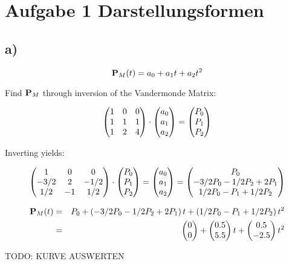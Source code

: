 
\section*{Aufgabe 1 Darstellungsformen}

\subsection*{a)}


\begin{equation}
    {\bf P}_M(t) = a_0 + a_1 t + a_2 t^2
\end{equation}

Find ${\bf P}_M$ through inversion of the Vandermonde Matrix:

\begin{equation}
    \left( \begin{matrix}1 & 0 & 0 \\ 1 & 1 & 1 \\ 1 & 2 & 4\end{matrix}\right) \cdot \left( \begin{matrix}a_0 \\ a_1 \\ a_2\end{matrix}\right) = \left( \begin{matrix}P_0 \\ P_1 \\ P_2\end{matrix}\right)
\end{equation}

Inverting yields:

\begin{equation}
    \left( \begin{matrix}1 & 0 & 0 \\ -3/2 & 2  & -1/2  \\ 1/2 & -1 & 1/2\end{matrix}\right) \cdot \left( \begin{matrix}P_0 \\ P_1 \\ P_2\end{matrix}\right) = \left( \begin{matrix}a_0 \\ a_1 \\ a_2\end{matrix}\right) 
    = \left( \begin{matrix}P_0 \\ -3/2 P_0 - 1/2 P_2 + 2 P_1 \\ 1/2 P_0 - P_1 + 1/2 P_2\end{matrix}\right)
\end{equation}


\begin{eqnarray}
     {\bf P}_M(t) &=&  P_0  + \left( -3/2 P_0 - 1/2 P_2 + 2 P_1 \right) t + \left( 1/2 P_0 - P_1 + 1/2 P_2 \right) t^2 \\
&=& \left( \begin{matrix}0 \\0\end{matrix}\right) + \left( \begin{matrix}0.5 \\ 5.5 \end{matrix}\right) t   + \left( \begin{matrix}0.5 \\ - 2.5 \end{matrix}\right) t^2 
\end{eqnarray}


TODO: KURVE AUSWERTEN

